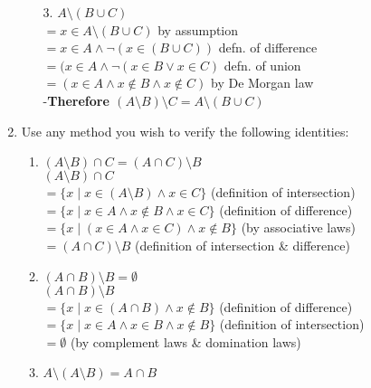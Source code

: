 \documentclass[11pt]{article}
\begin{document}
\begin{enumerate}
\begin{enumerate}
  \item[3.] $A \setminus (B \cup C)$\\

    $= x \in A \setminus (B \cup C)$    by assumption\\
    $ = x \in A \land \neg(x \in (B \cup C))$   defn. of difference \\
    $ = (x \in A \land \neg(x \in B \lor x \in C)$  defn. of union\\
  $ = (x \in A \land x \notin B \land x \notin C)$  by De Morgan law\\


  -\textbf{Therefore $(A \setminus B) \setminus C = A \setminus (B \cup C)$}


  \end{enumerate}

\newpage
\item Use any method you wish to verify the following identities:\\

  \begin{enumerate}
  \item $(A \setminus B) \cap C = (A \cap C) \setminus B$\\
  
   $(A \setminus B) \cap C$ \\
$= \{x \mid x \in (A \setminus B) \land x \in C\}$   
   (definition of intersection)\\
$= \{x \mid x \in A \land x \notin  B \land x \in C\}$      (definition of difference)\\
$= \{x \mid (x \in A \land x \in C) \land x \notin B\}$  (by associative laws)\\
$= (A \cap C) \setminus B$       (definition of intersection \& difference)  \\

  \item $(A \cap B) \setminus B = \emptyset$\\

    $(A \cap B) \setminus B$   \\
$= \{x \mid x \in (A \cap B) \land x \notin B\}$    (definition of difference)\\
$= \{x \mid x \in A \land x \in B \land x \notin B\}$ (definition of intersection)\\
$= \emptyset$   (by complement laws \& domination laws)\\


  \item $A \setminus (A \setminus B) = A \cap B$\\
  

\end{enumerate}
\end{enumerate}
\end{document}
